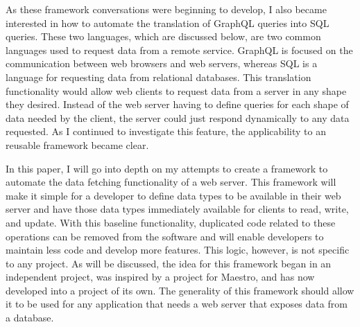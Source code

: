 As these framework conversations were beginning to develop, I also became interested in how to automate the translation of GraphQL queries into SQL queries.  These two languages, which are discussed below, are two common languages used to request data from a remote service.  GraphQL is focused on the communication between web browsers and web servers, whereas SQL is a language for requesting data from relational databases.  This translation functionality would allow web clients to request data from a server in any shape they desired.  Instead of the web server having to define queries for each shape of data needed by the client, the server could just respond dynamically to any data requested.  As I continued to investigate this feature, the applicability to an reusable framework became clear.

In this paper, I will go into depth on my attempts to create a framework to automate the data fetching functionality of a web server. This framework will make it simple for a developer to define data types to be available in their web server and have those data types immediately available for clients to read, write, and update.  With this baseline functionality, duplicated code related to these operations can be removed from the software and will enable developers to maintain less code and develop more features.  This logic, however, is not specific to any project.  As will be discussed, the idea for this framework began in an independent project, was inspired by a project for Maestro, and has now developed into a project of its own.  The generality of this framework should allow it to be used for any application that needs a web server that exposes data from a database.